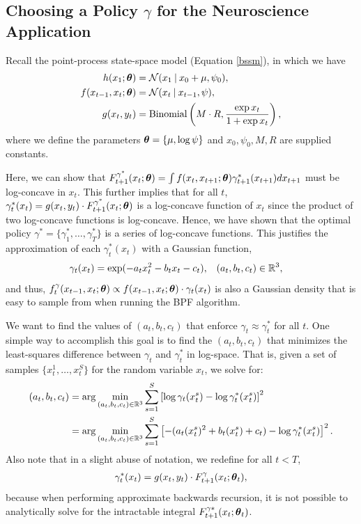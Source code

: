 \documentclass[twoside]{article}
\begin{document}
\subsection{Choosing a Policy $\gamma$ for the Neuroscience Application}  
Recall the point-process state-space model (Equation \ref{bssm}), in which we have
\begin{align*} 
h(x_1; \boldsymbol{\theta}) &= \mathcal{N}(x_1 \:\vert\: x_0 + \mu, \psi_0), \\
f(x_{t-1}, x_t ; \boldsymbol{\theta}) &= \mathcal{N}(x_t \:\vert\: x_{t-1} , \psi),  \\
g(x_t, y_t) &= \text{Binomial}\left(M \cdot R, \frac{\exp x_t}{1 + \exp x_t}\right),
\end{align*} 
where we define the parameters $\boldsymbol{\theta} = \{\mu, \log \psi\}$ and $x_0, \psi_0, M, R$ are supplied constants.   

Here, we can show that $F^{\gamma^*}_{t+1}(x_t; \boldsymbol{\theta}) = \int f(x_{t}, x_{t+1}; \boldsymbol{\theta})\gamma^*_{t+1}(x_{t+1}) dx_{t+1}$ must be log-concave in $x_{t}$.  This further implies that for all $t$, $\gamma^*_t(x_t) = g(x_t, y_t) \cdot F^{\gamma^*}_{t+1}(x_t; \boldsymbol{\theta})$ is a log-concave function of $x_t$ since the product of two log-concave functions is log-concave.  Hence, we have shown that the optimal policy $\gamma^* = \{\gamma^*_1, \ldots, \gamma^*_T\}$ is a series of log-concave functions.  This justifies the approximation of each $\gamma^*_t(x_t)$ with a Gaussian function, 
\begin{align*}
\gamma_t(x_t) = \exp(-a_t x_t^2 - b_t x_t - c_t), & \quad (a_t, b_t, c_t) \in \mathbb{R}^3,
\end{align*}
and thus, $f_t^{\gamma}(x_{t-1}, x_t; \boldsymbol{\theta}) \propto f(x_{t-1}, x_t; \boldsymbol{\theta}) \cdot \gamma_t(x_t)$ is also a Gaussian density that is easy to sample from when running the BPF algorithm.

We want to find the values of $(a_t, b_t, c_t)$ that enforce $\gamma_t \approx \gamma_t^*$ for all $t$.  One simple way to accomplish this goal is to find the $(a_t, b_t, c_t)$ that minimizes the least-squares difference between $\gamma_t$ and $\gamma_t^*$ in log-space.  That is, given a set of samples $\{x_t^1, \ldots, x_t^S\}$ for the random variable $x_t$, we solve for: 
\begin{align*}
(a_t, b_t, c_t) &= \arg \min_{(a_t, b_t, c_t) \in \mathbb{R}^3} \sum_{s=1}^S \left[\log \gamma_t(x_t^s) - \log \gamma^*_t(x_t^s) \right]^2  \\
&=  \arg \min_{(a_t, b_t, c_t) \in \mathbb{R}^3} \sum_{s=1}^S \left[-(a_t (x_t^s)^2 + b_t (x_t^s) + c_t) - \log \gamma^*_t(x_t^s) \right]^2.
\end{align*}
Also note that in a slight abuse of notation, we redefine for all $t < T$,
\begin{align*}
\gamma_t^*(x_t) = g(x_t, y_t) \cdot F^\gamma_{t+1}(x_t; \boldsymbol{\theta}_t), 
\end{align*}
because when performing approximate backwards recursion, it is not possible to analytically solve for the intractable integral $F^{\gamma*}_{t+1}(x_t; \boldsymbol{\theta}_t)$.    
\end{document}
